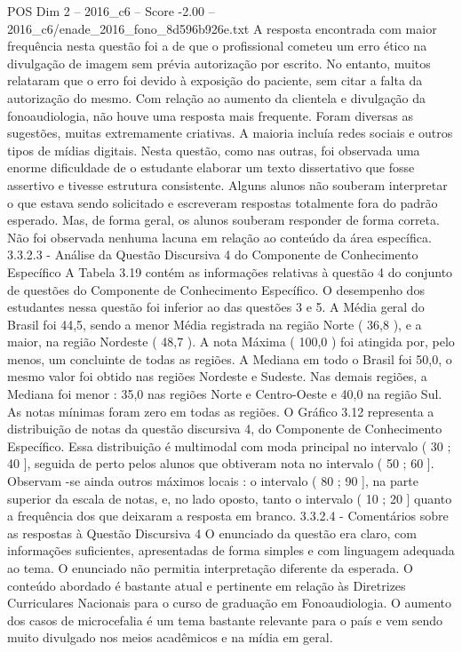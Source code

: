 \begin{textsample}{POS Dim 2 – 2016\_c6 – Score -2.00 – 2016\_c6/enade\_2016\_fono\_8d596b926e.txt}
A resposta encontrada com maior frequência nesta questão foi a de que o profissional cometeu um erro ético na divulgação de imagem sem prévia autorização por escrito.
No entanto, muitos relataram que o erro foi devido à exposição do paciente, sem citar a falta da autorização do mesmo.
Com relação ao aumento da clientela e divulgação da fonoaudiologia, não houve uma resposta mais frequente.
Foram diversas as sugestões, muitas extremamente criativas.
A maioria incluía redes sociais e outros tipos de mídias digitais.
Nesta questão, como nas outras, foi observada uma enorme dificuldade de o estudante elaborar um texto dissertativo que fosse assertivo e tivesse estrutura consistente.
Alguns alunos não souberam interpretar o que estava sendo solicitado e escreveram respostas totalmente fora do padrão esperado.
Mas, de forma geral, os alunos souberam responder de forma correta.
Não foi observada nenhuma lacuna em relação ao conteúdo da área específica. 3.3.2.3 - Análise da Questão Discursiva 4 do Componente de Conhecimento Específico A Tabela 3.19 contém as informações relativas à questão 4 do conjunto de questões do Componente de Conhecimento Específico.
O desempenho dos estudantes nessa questão foi inferior ao das questões 3 e 5.
A Média geral do Brasil foi 44,5, sendo a menor Média registrada na região Norte ( 36,8 ), e a maior, na região Nordeste ( 48,7 ).
A nota Máxima ( 100,0 ) foi atingida por, pelo menos, um concluinte de todas as regiões.
A Mediana em todo o Brasil foi 50,0, o mesmo valor foi obtido nas regiões Nordeste e Sudeste.
Nas demais regiões, a Mediana foi menor : 35,0 nas regiões Norte e Centro-Oeste e 40,0 na região Sul.
As notas mínimas foram zero em todas as regiões.
O Gráfico 3.12 representa a distribuição de notas da questão discursiva 4, do Componente de Conhecimento Específico.
Essa distribuição é multimodal com moda principal no intervalo ( 30 ; 40 ], seguida de perto pelos alunos que obtiveram nota no intervalo ( 50 ; 60 ].
Observam -se ainda outros máximos locais : o intervalo ( 80 ; 90 ], na parte superior da escala de notas, e, no lado oposto, tanto o intervalo ( 10 ; 20 ] quanto a frequência dos que deixaram a resposta em branco. 3.3.2.4 - Comentários sobre as respostas à Questão Discursiva 4 O enunciado da questão era claro, com informações suficientes, apresentadas de forma simples e com linguagem adequada ao tema.
O enunciado não permitia interpretação diferente da esperada.
O conteúdo abordado é bastante atual e pertinente em relação às Diretrizes Curriculares Nacionais para o curso de graduação em Fonoaudiologia.
O aumento dos casos de microcefalia é um tema bastante relevante para o país e vem sendo muito divulgado nos meios acadêmicos e na mídia em geral.

\end{textsample}
